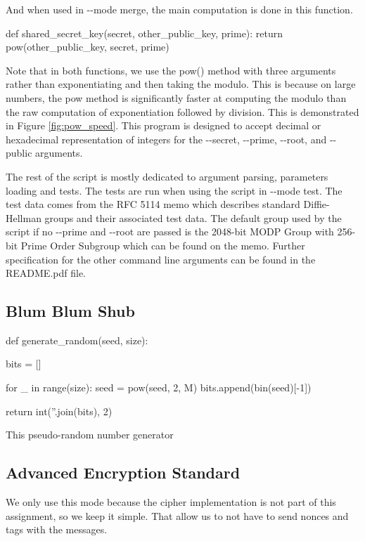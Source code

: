 \documentclass{article}
\begin{document}
And when used in -{}-mode merge, the main computation is done in this function.

\bigskip
\begin{python}
def shared_secret_key(secret, other_public_key, prime):
    return pow(other_public_key, secret, prime)
\end{python}
\bigskip

Note that in both functions, we use the pow() method with three arguments rather than exponentiating and then taking the modulo. This is because on large numbers, the pow method is significantly faster at computing the modulo than the raw computation of exponentiation followed by division. This is demonstrated in Figure \ref{fig:pow_speed}. This program is designed to accept decimal or hexadecimal representation of integers for the -{}-secret, -{}-prime, -{}-root, and -{}-public arguments.

The rest of the script is mostly dedicated to argument parsing, parameters loading and tests. The tests are run when using the script in -{}-mode test. The test data comes from the RFC 5114\cite{rfc5114} memo which describes standard Diffie-Hellman groups and their associated test data. The default group used by the script if no -{}-prime and -{}-root are passed is the 2048-bit MODP Group with 256-bit Prime Order Subgroup which can be found on the memo.
Further specification for the other command line arguments can be found in the README.pdf file.

\subsection{Blum Blum Shub}



\begin{python}
def generate_random(seed, size):

    bits = []

    for _ in range(size):
        seed = pow(seed, 2, M)
        bits.append(bin(seed)[-1])
    
    return int(''.join(bits), 2)
\end{python}

This pseudo-random number generator

\subsection{Advanced Encryption Standard}
We only use this mode because the cipher implementation is not part of this assignment, so we keep it simple. That allow us to not have to send nonces and tags with the messages.
\end{document}
